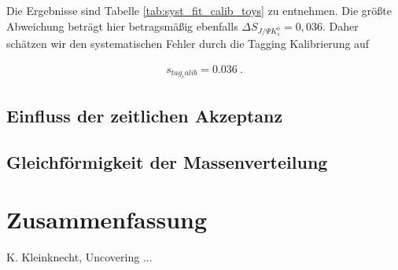 \documentclass[a4paper]{scrbook}
\newcommand{\SJPsi}{S_{J/\Psi K_s^0}}
\begin{document}
Die Ergebnisse sind Tabelle \ref{tab:syst_fit_calib_toys} zu entnehmen. Die größte Abweichung beträgt hier betragsmäßig ebenfalls $\Delta\SJPsi = 0,036$. Daher schätzen wir den systematischen Fehler durch die Tagging Kalibrierung auf 

\begin{align}
s_{tag_calib} = 0.036 \ .
\end{align}

\section{Einfluss der zeitlichen Akzeptanz}

\section{Gleichförmigkeit der Massenverteilung}

\chapter{Zusammenfassung}

\begin{thebibliography}{---}
  K. Kleinknecht, Uncovering ...
\end{thebibliography}

\printglossaries 

\end{document}
